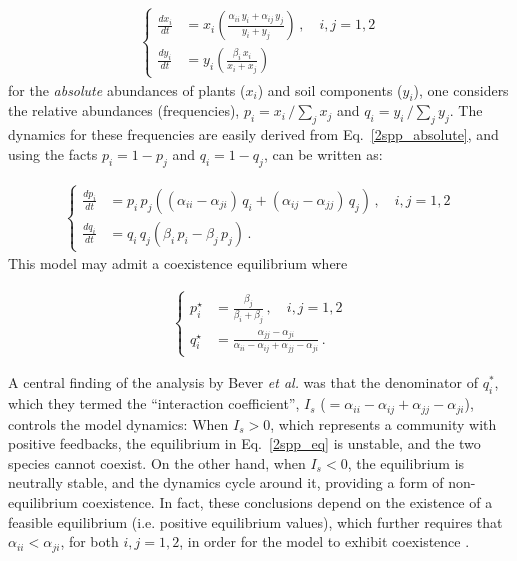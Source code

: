 \documentclass[11pt]{article}
\begin{document}
\begin{align} \label{2spp_absolute}
	\begin{cases}
	\frac{dx_i}{dt} &= x_i \left( \frac{\alpha_{ii} \, y_i + \alpha_{ij} \, y_j}{y_i + y_j} \right) \, , \quad  i, j = 1,2 \\
	\frac{dy_i}{dt} &= y_i \left( \frac{\beta_i \, x_i}{x_i + x_j} \right)
	\end{cases}
\end{align}
for the \emph{absolute} abundances of plants ($x_i$) and soil components ($y_i$), one considers the relative abundances (frequencies), $p_i = x_i \, / \sum_j x_j$ and $q_i = y_i \, / \sum_{j} y_j$. The dynamics for these frequencies are easily derived from Eq.~\ref{2spp_absolute}, and using the facts $p_i = 1 - p_j$ and $q_i = 1 - q_j$, can be written as:

\begin{align} \label{2spp_relative}
\begin{cases}
\frac{dp_i}{dt} &= p_i \, p_j \left( (\alpha_{ii} - \alpha_{ji}) \, q_i + (\alpha_{ij} - \alpha_{jj}) \, q_j \right) \, , \quad  i, j = 1,2 \\
\frac{dq_i}{dt} &= q_i \, q_j (\beta_i \, p_i - \beta_j \, p_j) \, .
\end{cases}
\end{align}
This model may admit a coexistence equilibrium where

\begin{align} \label{2spp_eq}
\begin{cases}
p_i^\star &= \frac{\beta_j}{\beta_i + \beta_j} \, , \quad  i, j = 1,2 \\
q_i^\star &= \frac{\alpha_{jj} - \alpha_{ji}}{\alpha_{ii} - \alpha_{ij} + \alpha_{jj} - \alpha_{ji}} \, .
\end{cases}
\end{align}

A central finding of the analysis by Bever \textit{et al.} was that the denominator of $q_i^*$, which they termed the ``interaction coefficient'', $I_s$ ($= \alpha_{ii} - \alpha_{ij} + \alpha_{jj} - \alpha_{ji}$), controls the model dynamics: When $I_s > 0$, which represents a community with positive feedbacks, the equilibrium in Eq.~\ref{2spp_eq} is unstable, and the two species cannot coexist. On the other hand, when $I_s < 0$, the equilibrium is neutrally stable, and the dynamics cycle around it, providing a form of non-equilibrium coexistence. In fact, these conclusions depend on the existence of a feasible equilibrium (i.e. positive equilibrium values), which further requires that $\alpha_{ii} < \alpha_{ji}$, for both $i, j = 1, 2$, in order for the model to exhibit coexistence \citep{bever1997incorporating,ke2015incorporating}. 
\end{document}
